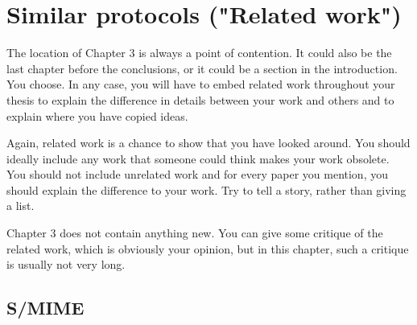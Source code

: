 
\section{Similar protocols ("Related work")}

The location of Chapter 3 is always a point of contention. It
could also be the last chapter before the conclusions, or it could
be a section in the introduction. You choose. In any case, you will
have to embed related work throughout your thesis to explain
the difference in details between your work and others and to
explain where you have copied ideas.

Again, related work is a chance to show that you have looked
around. You should ideally include any work that someone could
think makes your work obsolete. You should not include unrelated
work and for every paper you mention, you should explain the
difference to your work. Try to tell a story, rather than giving a
list.

Chapter 3 does not contain anything new. You can give some critique
of the related work, which is obviously your opinion, but in this
chapter, such a critique is usually not very long.

\subsection{S/MIME}